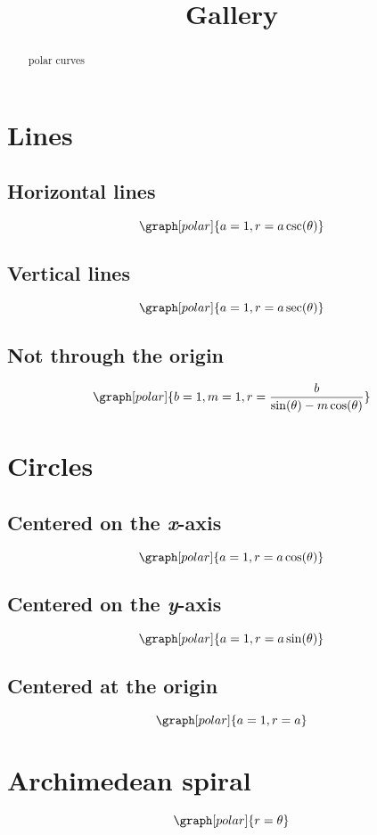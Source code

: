 \documentclass{ximera}
\title{Gallery}
\begin{document}
\begin{abstract}
polar curves
\end{abstract}
\maketitle

\section*{Lines}

\subsection*{Horizontal lines}
\[
\graph[polar]{a=1,r=a \csc(\theta)}
\]
\subsection*{Vertical lines}
\[
\graph[polar]{a=1,r=a \sec(\theta)}
\]
\subsection*{Not through the origin}
\[
\graph[polar]{b=1,m=1,r=\frac{b}{\sin(\theta)-m \cos(\theta)}}
\]

\section*{Circles}

\subsection*{Centered on the \textit{x}-axis}
\[
\graph[polar]{a=1, r=a \cos(\theta)}
\]

\subsection*{Centered on the \textit{y}-axis}
\[
\graph[polar]{a=1,r=a \sin(\theta)}
\]

\subsection*{Centered at the origin}
\[
\graph[polar]{a=1,r=a}
\]

\section*{Archimedean spiral}
\[
\graph[polar]{r=\theta}
\]
\end{document}
